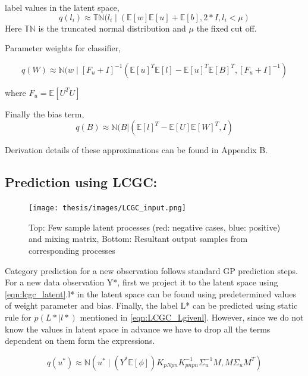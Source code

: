 label values in the latent space, 
\begin{equation}
q(l_i) \approx \mathbb{T}\mathbb{N}(l_i \mid (\mathbb{E}[w]\mathbb{E}[u] + \mathbb{E}[b], 2*I, l_i < \mu)
\end{equation}
Here $\mathbb{T}\mathbb{N}$ is the truncated normal distribution and $\mu$ the fixed cut off.

Parameter weights for classifier, 

\begin{equation}
q(W) \approx \mathbb{N}(w \mid [F_u+I]^{-1}(\mathbb{E}[u]^T\mathbb{E}[l] - \mathbb{E}[u]^T\mathbb{E}[B]^T,[F_u+I]^{-1})
\end{equation}

where $F_u = \mathbb{E}[U^{T}U]$

Finally the bias term,
\begin{equation}
q(B) \approx \mathbb{N}(B | (\mathbb{E}[l]^T - \mathbb{E}[U]\mathbb{E}[W]^T,I)
\end{equation}

Derivation details of these approximations can be found in Appendix B. 

\subsection{Prediction using LCGC:}
\begin{figure}
    \centering
    \texttt{[image: thesis/images/LCGC\_input.png]}
    \caption{Top: Few sample latent processes (red: negative cases, blue: positive) and mixing matrix, Bottom: Resultant output samples from corresponding processes}
    \label{fig:lcpc_input_demo}
\end{figure}

Category prediction for a new observation follows standard GP prediction steps.
For a new data observation Y*, first we project it to the latent space using \ref{eqn:lcgc_latent}.l* in the latent space can be found using predetermined values of weight parameter and bias. Finally, the label L* can be predicted using static rule for $p(L* \mid l*)$ mentioned in \ref{eqn:LCGC_Lgivenl}. However, since we do not know the values in latent space in advance we have to drop all the terms dependent on them form the expressions.

\begin{equation}
q(u^*) \approx \mathbb{N}(u^* \mid (Y^*\mathbb{E}[\phi])K_{pNpn}K_{pnpn}^{-1}\Sigma_{u}^{-1}M, M\Sigma_{u}M^T)
\end{equation}

